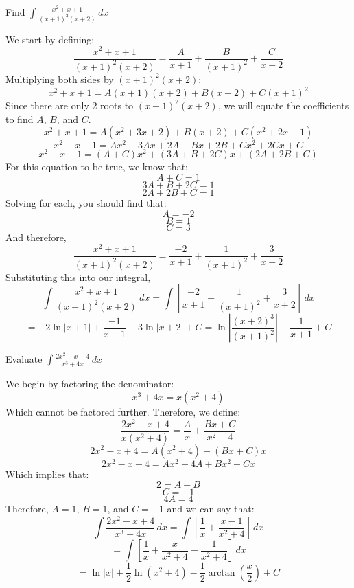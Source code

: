 \begin{Worked}
\begin{Problem}
Find $\int \frac{x^2 + x + 1}{(x + 1)^2 (x + 2)}\,dx$
\end{Problem}
\begin{Solution}
We start by defining:
$$\frac{x^2 + x + 1}{(x + 1)^2 (x + 2)} = \frac{A}{x + 1} + \frac{B}{(x + 1)^
2} + \frac{C}{x + 2}$$
Multiplying both sides by $(x + 1)^2 (x + 2)$:
$$x^2 + x + 1 = A(x + 1)(x + 2) + B(x + 2) + C(x + 1)^2$$
Since there are only 2 roots to $(x + 1)^2 (x + 2)$, we will equate the 
coefficients to find $A$, $B$, and $C$. 
$$x^2 + x + 1 = A(x^2 + 3x + 2) + B(x + 2) + C(x^2 + 2x + 1)$$
$$x^2 + x + 1 = Ax^2 + 3Ax + 2A + Bx + 2B + Cx^2 + 2Cx + C$$
$$x^2 + x + 1 = (A + C)x^2 + (3A + B + 2C)x + (2A + 2B + C)$$
For this equation to be true, we know that:
$$A + C = 1$$
$$3A + B + 2C = 1$$
$$2A + 2B + C = 1$$
Solving for each, you should find that:
$$A = -2$$
$$B = 1$$
$$C = 3$$
And therefore, 
$$\frac{x^2 + x + 1}{(x + 1)^2 (x + 2)} = \frac{-2}{x + 1} + \frac{1}{(x + 1)^
2} + \frac{3}{x + 2}$$
Substituting this into our integral, 
$$\int \frac{x^2 + x + 1}{(x + 1)^2 (x + 2)}\,dx = \int \left[ \frac{-2}{x + 1} 
+ \frac{1}{(x + 1)^2} + \frac{3}{x + 2} \right]\,dx$$
$$ = -2\ln{|x + 1|} + \frac{-1}{x + 1} + 3\ln{|x + 2|} + C = \ln{ \left| \frac{
(x + 2)^3}{(x + 1)^2} \right| } - \frac{1}{x + 1} + C$$
\end{Solution}
\end{Worked}


\begin{Worked}
\begin{Problem}
Evaluate $\int \frac{2x^2 - x + 4}{x^3 + 4x}\,dx$
\end{Problem}
\begin{Solution}
We begin by factoring the denominator:
$$x^3 + 4x = x(x^2 + 4)$$
Which cannot be factored further. Therefore, we define:
$$\frac{2x^2 - x + 4}{x(x^2 + 4)} = \frac{A}{x} + \frac{Bx + C}{x^2 + 4}$$
$$2x^2 - x + 4 = A(x^2 + 4) + (Bx + C)x$$
$$2x^2 - x + 4 = Ax^2 + 4A + Bx^2 + Cx$$
Which implies that:
$$2 = A + B$$
$$C = -1$$
$$4A = 4$$
Therefore, $A = 1$, $B = 1$, and $C = -1$ and we can say that:
$$\int \frac{2x^2 - x + 4}{x^3 + 4x}\,dx = \int	\left[ \frac{1}{x} + \frac{x - 
1}{x^2 + 4} \right] \,dx$$
$$= \int \left[ \frac{1}{x} + \frac{x}{x^2 + 4} - \frac{1}{x^2 + 4} \right]\,
dx$$
$$= \ln{|x|} + \frac{1}{2}\ln{(x^2 + 4)} - \frac{1}{2}\arctan{\left( \frac{x}{2} 
\right) } + C$$
\end{Solution}
\end{Worked}

